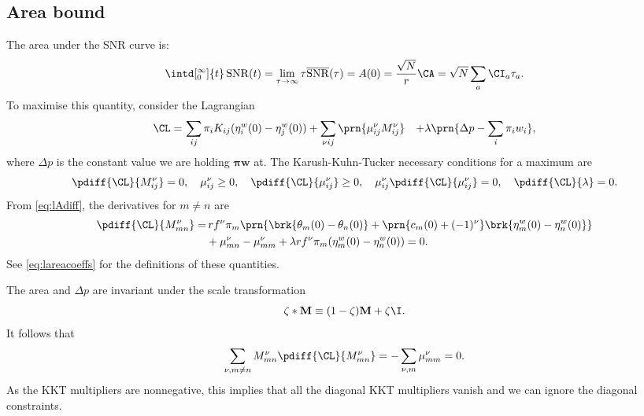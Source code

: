 \documentclass[12pt]{article}
\newcommand{\eqm}{\pi}
\newcommand{\eq}{\boldsymbol{\eqm}}
\newcommand{\etwm}{\eta^w}
\newcommand{\thbm}{\theta}
\newcommand{\wm}{w}
\newcommand{\w}{\mathbf{\wm}}
\newcommand{\MMdm}{M}
\newcommand{\MMd}{\mathbf{\MMdm}}
\newcommand{\encm}{K}
\newcommand{\kktm}{\mu}
\DeclareMathOperator{\snr}{SNR}
\newcommand{\snrb}{\overline{\snr}}
\begin{document}

\subsection{Area bound}\label{sec:area}

The area under the SNR curve is:
%
\begin{equation}\label{eq:areadef}
  \intd[_0^\infty]{t} \snr(t) = \lim_{\tau\to\infty} \tau \snrb(\tau) 
      = A(0) = \frac{\sqrt{N}}{r} \CA = \sqrt{N} \sum_a \CI_a \tau_a.
\end{equation}
%
To maximise this quantity, consider the Lagrangian
%
\begin{equation}\label{eq:arealagrangian}
\begin{aligned}
  \CL =&\, \sum_{ij} \eqm_i \encm_{ij} (\etwm_i(0) - \etwm_j(0))
        +\sum_{\nu i j} \prn{ \kktm^\nu_{ij} \MMdm^\nu_{ij} }
        &+ \lambda \prn{ \Delta p - \sum_i \eqm_i \wm_i },
\end{aligned}
\end{equation}
%
where \(\Delta p\) is the constant value we are holding \(\eq\w\) at.
The Karush-Kuhn-Tucker necessary conditions for a maximum are
%
\begin{equation}\label{eq:KTarea}
  \pdiff{\CL}{\MMdm^\nu_{ij}} = 0, \quad
  \kktm^\nu_{ij} \geq 0, \quad
  \pdiff{\CL}{\kktm^\nu_{ij}} \geq 0, \quad
  \kktm^\nu_{ij}\pdiff{\CL}{\kktm^\nu_{ij}} = 0, \quad
  \pdiff{\CL}{\lambda} = 0.
\end{equation}
%
From \cref{eq:lAdiff}, the derivatives for \(m \neq n\) are
%
\begin{equation}\label{eq:areaderivs}
\begin{aligned}
  \pdiff{\CL}{\MMdm^\nu_{mn}} = & \,
    r f^\nu \eqm_m \prn{ \brk{\thbm_m(0) - \thbm_n(0)}
     + \prn{c_m(0) + (-1)^\nu} \brk{\etwm_m(0) - \etwm_n(0)} } \\
     &+ \kktm^\nu_{mn} -  \kktm^\nu_{mm}
     + \lambda r f^\nu \eqm_m (\etwm_{m}(0)-\etwm_{n}(0)) 
    = 0.
\end{aligned}
\end{equation}
%
See \cref{eq:lareacoeffs} for the definitions of these quantities.

The area and \(\Delta p\) are invariant under the scale transformation %
%
\begin{equation}\label{eq:scale}
  \zeta * \MMd \equiv (1-\zeta) \MMd + \zeta \I .
\end{equation}
%
It follows that
%
\begin{equation*}
  \sum_{\nu, m \neq n} \MMdm^\nu_{mn} \pdiff{\CL}{\MMdm^\nu_{mn}} 
    = - \sum_{\nu, m} \kktm^\nu_{mm} = 0 .
\end{equation*}
%
As the KKT multipliers are nonnegative, this implies that all the diagonal KKT multipliers vanish and we can ignore the diagonal constraints.
\end{document}
